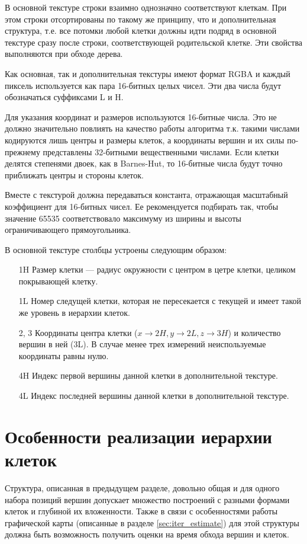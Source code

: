 В основной текстуре строки взаимно однозначно соответствуют клеткам. При этом строки отсортированы по такому же принципу, что и дополнительная структура, т.е. все потомки любой клетки должны идти подряд в основной текстуре сразу после строки, соответствующей родительской клетке. Эти свойства выполняются при обходе дерева.

Как основная, так и дополнительная текстуры имеют формат RGBA и каждый пиксель используется как пара 16-битных целых чисел. Эти два числа будут обозначаться суффиксами L и H.

Для указания координат и размеров используются 16-битные числа. Это не должно значительно повлиять на качество работы алгоритма т.к. такими числами кодируются лишь центры и размеры клеток, а координаты вершин и их силы по-прежнему представлены 32-битными вещественными числами. Если клетки делятся степенями двоек, как в Barnes-Hut, то 16-битные числа будут точно приближать центры и стороны клеток.

Вместе с текстурой должна передаваться константа, отражающая масштабный коэффициент для 16-битных чисел. Ее рекомендуется подбирать так, чтобы значение 65535 соответствовало максимуму из ширины и высоты ограничивающего прямоугольника.

В основной текстуре столбцы устроены следующим образом:

\begin{itemize}
\item[1H] Размер клетки --- радиус окружности с центром в цетре клетки, целиком покрывающей клетку.
\item[1L] Номер следущей клетки, которая не пересекается с текущей и имеет такой же уровень в иерархии клеток.
\item[2, 3] Координаты центра клетки ($x\to 2H, y\to 2L, z\to 3H$) и количество вершин в ней (3L). В случае менее трех измерений неиспользуемые координаты равны нулю.
\item[4H] Индекс первой вершины данной клетки в дополнительной текстуре.
\item[4L] Индекс последней вершины данной клетки в дополнительной текстуре.
\end{itemize}

\section{Особенности реализации иерархии клеток}

Структура, описанная в предыдущем разделе, довольно общая и для одного набора позиций вершин допускает множество построений с разными формами клеток и глубиной их вложенности. Также в связи с особенностями работы графической карты (описанные в разделе \ref{sec:iter_estimate}) для этой структуры должна быть возможность получить оценки на время обхода вершин и клеток.

